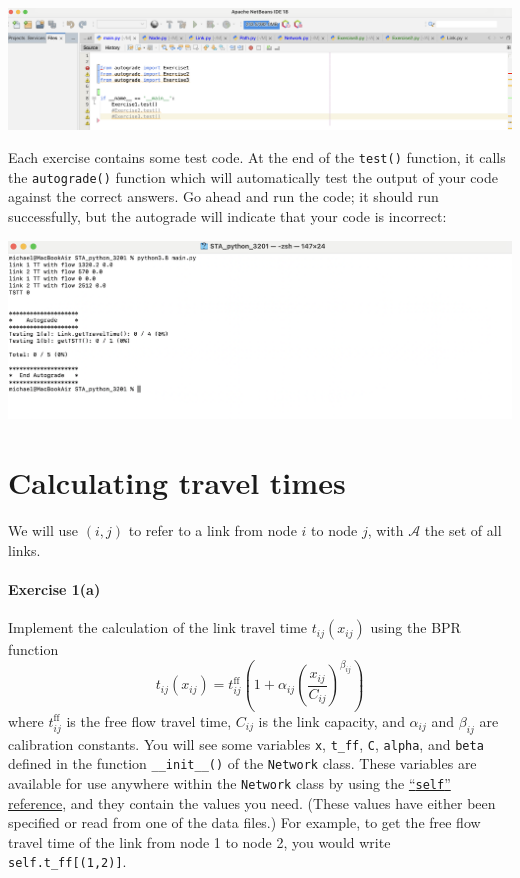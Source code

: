 \documentclass[11pt]{article}
\newcommand{\A}{\mathcal{A}}
\newcommand{\tff}{t^{\mathrm{ff}}_{ij}}
\begin{document}
	\begin{center}
		\includegraphics[width=\textwidth]{netbeans1.png}
	\end{center}
	
	Each exercise contains some test code. At the end of the \texttt{test()} function, it calls the \texttt{autograde()} function which will automatically test the output of your code against the correct answers. Go ahead and run the code; it should run successfully, but the autograde will indicate that your code is incorrect:
	
	\begin{center}
		\includegraphics[width=\textwidth]{netbeans1a.png}
	\end{center}
	

\section{Calculating travel times}

We will use $(i,j)$ to refer to a link from node $i$ to node $j$, with $\A$ the set of all links. 

\paragraph*{Exercise 1(a)} Implement the calculation of the link travel time $t_{ij}(x_{ij})$ using the BPR function 
\begin{equation}
	t_{ij}(x_{ij}) = \tff \left(1+\alpha_{ij} \left(\frac{x_{ij}}{C_{ij}}\right)^{\beta_{ij}}\right) \label{bpr}
\end{equation}
 where $\tff$ is the free flow travel time, $C_{ij}$ is the link capacity, and $\alpha_{ij}$ and $\beta_{ij}$ are calibration constants.
You will see some variables \texttt{x}, \texttt{t\_ff}, \texttt{C}, \texttt{alpha}, and \texttt{beta} defined in the function \texttt{\_\_init\_\_()} of the \texttt{Network} class. These variables are available for use anywhere within the \texttt{Network} class by using the \href{https://www.w3schools.com/python/gloss_python_self.asp}{``\texttt{self}'' reference}, and they contain the values you need. (These values have either been specified or read from one of the data files.) For example, to get the free flow travel time of the link from node 1 to node 2, you would write \texttt{self.t\_ff[(1,2)]}.
\end{document}
